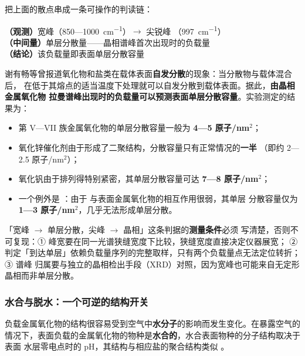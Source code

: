 \begin{dataflow}
把上面的散点串成一条可操作的判读链：

\textbf{（观测）}宽峰（850—\qty{1000}{cm^{-1}}）$\rightarrow$ 尖锐峰
（\qty{997}{cm^{-1}}）\\
\textbf{（中间量）}单层分散量——晶相谱峰首次出现时的负载量\\
\textbf{（结论）}该负载量即表面单层分散容量

谢有畅等曾报道氧化物和盐类在载体表面\textbf{自发分散}的现象：当分散物与载体混合后，
在低于其熔点的适当温度下处理就可以自发分散到载体表面。据此，\textbf{由晶相金属氧化物
拉曼谱峰出现时的负载量可以预测表面单层分散容量}。实验测定的结果为：

\begin{itemize}
\item 第 V—VII 族金属氧化物的单层分散容量一般为 \textbf{4—5 原子/nm$^2$}；
\item 氧化锌催化剂由于形成了二聚结构，分散容量只有正常情况的\textbf{一半}
  （即约 2—2.5 原子/nm$^2$）；
\item 氧化钒由于排列得特别紧密，其单层分散容量可达 \textbf{7—8 原子/nm$^2$}；
\item 一个例外是 ：由于  与表面金属氧化物的相互作用很弱，其单层
  分散容量仅为 \textbf{1—3 原子/nm$^2$}，几乎无法形成单层分散。
\end{itemize}

\end{dataflow}

\begin{measure}
「宽峰 $\rightarrow$ 单层分散，尖峰 $\rightarrow$ 晶相」这条判据的\textbf{测量条件}必须
写清楚，否则不可复现：① 峰宽要在同一光谱狭缝宽度下比较，狭缝宽度直接决定仪器展宽；
② 判定「到达单层」依赖负载量序列的完整取样，只有两个负载量点无法定位转折；③ 谱峰
归属要与独立的晶相检出手段（XRD）对照，因为宽峰也可能来自无定形晶相而非单层分散。
\end{measure}

\subsubsection{水合与脱水：一个可逆的结构开关}

负载金属氧化物的结构很容易受到空气中\textbf{水分子}的影响而发生变化。在暴露空气的
情况下，表面负载的金属氧化物的物种是\textbf{水合的}，水合表面物种的分子结构取决于表面
水层零电点时的 pH，其结构与相应盐的聚合结构类似
。


